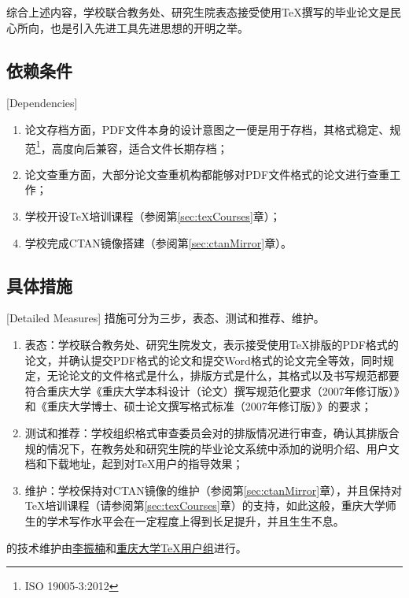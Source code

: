综合上述内容，学校联合教务处、研究生院表态接受使用\TeX 撰写的毕业论文是民心所向，也是引入先进工具先进思想的开明之举。

\subsection{依赖条件}[Dependencies]
\begin{enumerate}
	\item 论文存档方面，PDF文件本身的设计意图之一便是用于存档\cite{pdfISO}，其格式稳定、规范\footnote{ISO 19005-3:2012}，高度向后兼容，适合文件长期存档；
	\item 论文查重方面，大部分论文查重机构都能够对PDF文件格式的论文进行查重工作；
	\item 学校开设\TeX 培训课程（参阅第\ref{sec:texCourses}章）；
	\item 学校完成CTAN镜像搭建（参阅第\ref{sec:ctanMirror}章）。
\end{enumerate}

\subsection{具体措施}[Detailed Measures]
措施可分为三步，表态、测试和推荐、维护。

\begin{enumerate}
	\item 表态：学校联合教务处、研究生院发文，表示接受使用\TeX 排版的PDF格式的论文，并确认提交PDF格式的论文和提交Word格式的论文完全等效，同时规定，无论论文的文件格式是什么，排版方式是什么，其格式以及书写规范都要符合重庆大学《重庆大学本科设计（论文）撰写规范化要求（2007年修订版）》和《重庆大学博士、硕士论文撰写格式标准（2007年修订版）》的要求；
	\item 测试和推荐：学校组织格式审查委员会对\cquthesis 的排版情况进行审查，确认其排版合规的情况下，在教务处和研究生院的毕业论文系统中添加\cquthesis 的说明介绍、用户文档和下载地址，起到对\TeX 用户的指导效果；
	\item 维护：学校保持对CTAN镜像的维护（参阅第\ref{sec:ctanMirror}章），并且保持对\TeX 培训课程（请参阅第\ref{sec:texCourses}章）的支持，如此这般，重庆大学师生的学术写作水平会在一定程度上得到长足提升，并且生生不息。
\end{enumerate}

\cquthesis 的技术维护由\href{https://github.com/nanmu42/}{李振楠}和\href{http://jq.qq.com/?_wv=1027&k=2HvYu95}{重庆大学\TeX 用户组}进行。